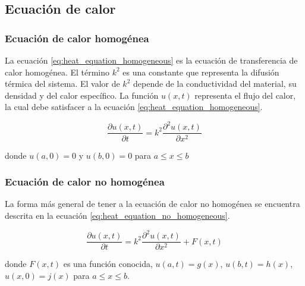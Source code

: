 \subsection{Ecuación de calor}

\subsubsection{Ecuación de calor homogénea}

La ecuación \ref{eq:heat_equation_homogeneous} es la ecuación de transferencia de calor homogénea. El término $k^2$ es una constante que representa la difusión térmica del sistema. El valor de $k^2$ depende de la conductividad del material, su densidad y del calor específico. La función $u(x,t)$ representa el flujo del calor, la cual debe satisfacer a la ecuación \ref{eq:heat_equation_homogeneous}.

\begin{equation}
    \frac{\partial u(x,t)}{\partial t} = k^2 \frac{\partial^2 u(x,t)}{\partial x^2} \label{eq:heat_equation_homogeneous}
\end{equation}

donde $u(a,0)=0$ y $u(b,0)=0$ para $a\leq x \leq b$

\subsubsection{Ecuación de calor no homogénea}


La forma más general de tener a la ecuación de calor no homogénea se encuentra descrita en la ecuación \ref{eq:heat_equation_no_homogeneous}.

\begin{equation}
    \frac{\partial u(x,t)}{\partial t} = k^2 \frac{\partial^2 u(x,t)}{\partial x^2}+F(x,t) \label{eq:heat_equation_no_homogeneous}
\end{equation}

donde $F(x,t)$ es una función conocida, $u(a,t)=g(x)$, $u(b,t)=h(x)$, $u(x,0)=j(x)$ para $a\leq x \leq b$\cite{trong_2005}.